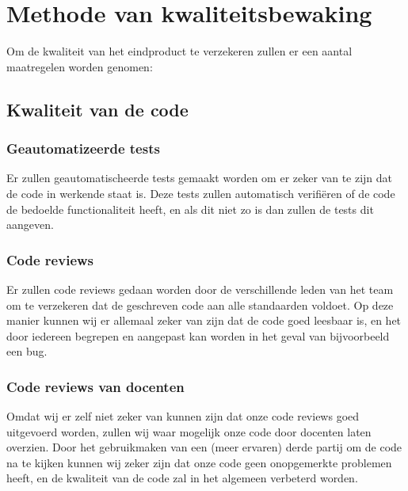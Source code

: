 \chapter{Methode van kwaliteitsbewaking}


Om de kwaliteit van het eindproduct te verzekeren zullen er een aantal maatregelen worden genomen:

\section{Kwaliteit van de code}
	\subsection{Geautomatizeerde tests}
		Er zullen geautomatischeerde tests gemaakt worden om er zeker van te zijn dat de code in werkende staat is.
		Deze tests zullen automatisch verifiëren of de code de bedoelde functionaliteit heeft, en als dit niet zo is dan zullen de tests dit aangeven.

	\subsection{Code reviews}
		Er zullen code reviews gedaan worden door de verschillende leden van het team om te verzekeren dat de geschreven code aan alle standaarden voldoet.
		Op deze manier kunnen wij er allemaal zeker van zijn dat de code goed leesbaar is, en het door iedereen begrepen en aangepast kan worden in het geval van bijvoorbeeld een bug.
		
	\subsection{Code reviews van docenten}
		Omdat wij er zelf niet zeker van kunnen zijn dat onze code reviews goed uitgevoerd worden, zullen wij waar mogelijk onze code door docenten laten overzien.
		Door het gebruikmaken van een (meer ervaren) derde partij om de code na te kijken kunnen wij zeker zijn dat onze code geen onopgemerkte problemen heeft, en de kwaliteit van de code zal in het algemeen verbeterd worden.

